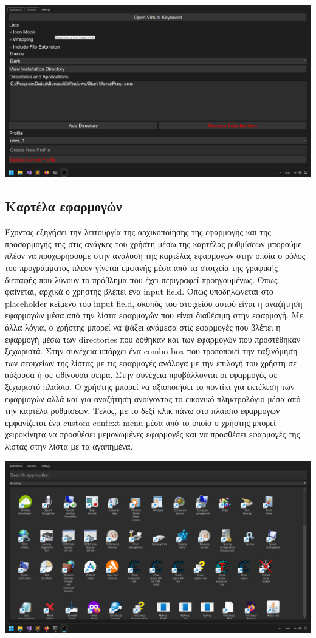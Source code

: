 \includegraphics[width=1.0\textwidth]{./images/tab_settings.png}

\subsection{Καρτέλα εφαρμογών}

Έχοντας εξηγήσει την λειτουργία της αρχικοποίησης της εφαρμογής και της προσαρμογής της στις
ανάγκες του χρήστη μέσω της καρτέλας ρυθμίσεων μπορούμε πλέον να προχωρήσουμε στην ανάλυση
της καρτέλας εφαρμογών στην οποία ο ρόλος του προγράμματος πλέον γίνεται εμφανής μέσα από τα
στοιχεία της γραφικής διεπαφής που λύνουν το πρόβλημα που έχει περιγραφεί προηγουμένως. 
Όπως φαίνεται, αρχικά ο χρήστης βλέπει ένα input field. Όπως υποδηλώνεται στο placeholder
κείμενο του input field, σκοπός του στοιχείου αυτού είναι η αναζήτηση εφαρμογών μέσα από την
λίστα εφαρμογών που είναι διαθέσιμη στην εφαρμογή. Με άλλα λόγια, ο χρήστης μπορεί να ψάξει 
ανάμεσα στις εφαρμογές που βλέπει η εφαρμογή μέσω των directories που δόθηκαν και των εφαρμογών
που προστέθηκαν ξεχωριστά. Στην συνέχεια υπάρχει ένα combo box που τροποποιεί την ταξινόμηση
των στοιχείων της λίστας με τις εφαρμογές ανάλογα με την επιλογή του χρήστη σε αύξουσα ή σε
φθίνουσα σειρά. Στην συνέχεια προβάλλονται οι εφαρμογές σε ξεχωριστό πλαίσιο. Ο χρήστης μπορεί
να αξιοποιήσει το ποντίκι για εκτέλεση των εφαρμογών αλλά και για αναζήτηση ανοίγοντας το εικονικό
πληκτρολόγιο μέσα από την καρτέλα ρυθμίσεων. Τέλος, με το δεξί κλικ πάνω στο πλαίσιο εφαρμογών
εμφανίζεται ένα custom context menu μέσα από το οποίο ο χρήστης μπορεί χειροκίνητα να προσθέσει
μεμονωμένες εφαρμογές και να προσθέσει εφαρμογές της λίστας στην λίστα με τα αγαπημένα.

\includegraphics[width=1.0\textwidth]{./images/tab_applications.png}

